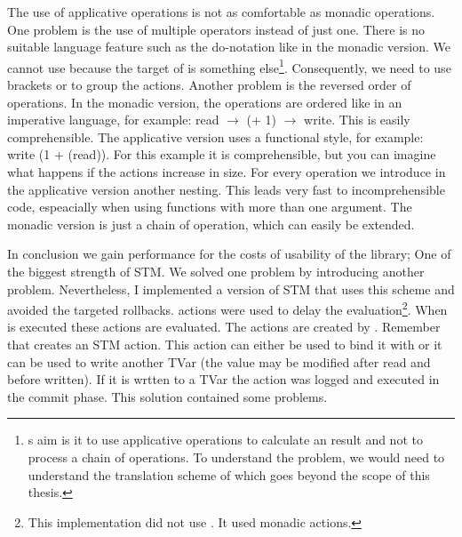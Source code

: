 The use of applicative operations is not as comfortable as monadic operations. One problem is the use of 
multiple operators instead of just one. There is no suitable language feature such as the do-notation like 
in the monadic version. We cannot use  because the target
of  is something else\footnote{s aim is it to use applicative 
operations to calculate an result and not to process a chain of operations. To understand the problem,
we would need to understand the translation scheme of  which goes beyond the scope of
this thesis.}. Consequently, we need to use brackets or \code{\$} to group the actions. Another problem is  
the reversed order of operations. In the monadic version, the operations are ordered like in an imperative
language, for example: read $\rightarrow$ (+ 1) $\rightarrow$ write. This is easily comprehensible. The 
applicative version uses a functional style, for example: write (1 + (read)). For this example it is 
comprehensible, but you can imagine what happens if the actions increase in size. For every operation
we introduce in the applicative version another nesting. This leads very fast to incomprehensible code,
espeacially when using functions with more than one argument. The monadic version is just a chain of operation, 
which can easily be extended. 

In conclusion we gain performance for the costs of usability of the library; One of the biggest strength of
STM. We solved one problem by introducing another problem. Nevertheless, I implemented a version of STM
that uses this scheme and avoided the targeted rollbacks.  actions were used
to delay the evaluation\footnote{This implementation did not use . It used monadic  actions.}. 
When \code{>>=} is executed these  actions are evaluated. The  actions are created by .
Remember that  creates an STM action. This action can either be used to bind it with \code{>>=} or it 
can be used to write another TVar (the value may be modified after read and before written). If it is wrtten to a 
TVar the  action was logged and executed in the commit phase. This solution contained some problems.

